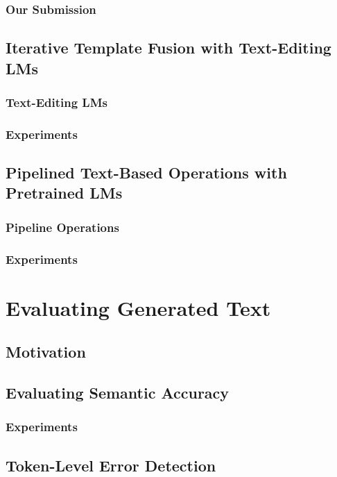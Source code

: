 \documentclass[12pt,notitlepage,a4paper,openright]{report}
\begin{document}
\subsection{Our Submission}
\label{sec:mbart}
\section{Iterative Template Fusion with Text-Editing LMs}
\label{sec:iterative}
\subsection{Text-Editing LMs}
\label{sec:text-editing}
\subsection{Experiments}
\label{sec:text-editing-exp}
\section{Pipelined Text-Based Operations with Pretrained LMs}
\label{sec:pipeline}
\subsection{Pipeline Operations}
\label{sec:pipeline-ops}
\subsection{Experiments}
\label{sec:pipeline-exp}

\chapter{Evaluating Generated Text}
\label{chap:evaluation}
\section{Motivation}
\label{sec:evalution-mot}
\section{Evaluating Semantic Accuracy}
\label{sec:sem-acc}
\subsection{Experiments}
\label{sec:sem-acc-exp}
\section{Token-Level Error Detection}
\label{sec:eval-token}
\end{document}
